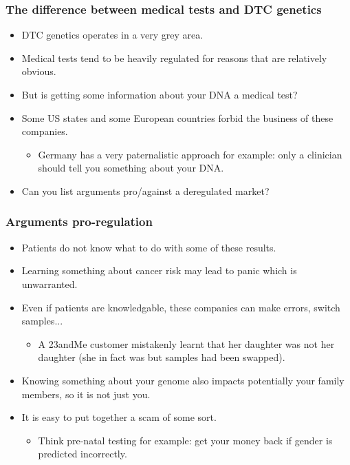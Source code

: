 \documentclass{beamer}
\begin{document}
\begin{frame}
  \frametitle{The difference between medical tests and DTC genetics}
  \begin{itemize}
  \item DTC genetics operates in a very grey area.
  \item Medical tests tend to be heavily regulated for reasons that are relatively obvious.
  \item But is getting some information about your DNA a medical test?
  \item Some US states and some European countries forbid the business of these companies.
    \begin{itemize}
    \item Germany has a very paternalistic approach for example: only a clinician should tell you something about your DNA.
    \end{itemize}
  \item Can you list arguments pro/against a deregulated market?
  \end{itemize}
\end{frame}




\begin{frame}
  \frametitle{Arguments pro-regulation}
  \begin{itemize}
  \item Patients do not know what to do with some of these results.
  \item Learning something about cancer risk may lead to panic which is unwarranted.
  \item Even if patients are knowledgable, these companies can make errors, switch samples...
    \begin{itemize}
      \item A 23andMe customer mistakenly learnt that her daughter was not her daughter (she in fact was but samples had been swapped).
    \end{itemize}
  \item Knowing something about your genome also impacts potentially your family members, so it is not just you.
  \item It is easy to put together a scam of some sort.
    \begin{itemize}
    \item Think pre-natal testing for example: get your money back if gender is predicted incorrectly.
    \end{itemize}
  \end{itemize}
\end{frame}
\end{document}
